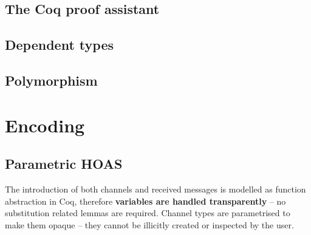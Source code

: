 \documentclass{mproj}
\begin{document}
\section{The Coq proof assistant}\label{coq}


\section{Dependent types}\label{dependent-types}

\section{Polymorphism}\label{polymorphism}

\chapter{Encoding}\label{encoding}

\section{Parametric HOAS}\label{continuation-passing}


The introduction of both channels and received messages is modelled as function
abstraction in Coq, therefore \textbf{variables are handled transparently} -- no
substitution related lemmas are required. Channel types are parametrised to make
them opaque -- they cannot be illicitly created or inspected by the user.
\end{document}
